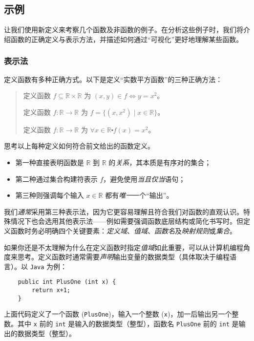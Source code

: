 
\subsection{示例}

让我们使用新定义来考察几个函数及非函数的例子。在分析这些例子时，我们将介绍函数的正确定义与表示方法，并描述如何通过``可视化''更好地理解某些函数。

\subsubsection*{表示法}

定义函数有多种正确方式。以下是定义``实数平方函数''的三种正确方法：
\begin{quotation}
    定义函数 $f \subseteq \mathbb{R} \times \mathbb{R}$ 为 $(x, y) \in f \iff y = x^2$。

    定义函数 $f : \mathbb{R} \to \mathbb{R}$ 为 $f=\big\{(x,x^2) \mid x \in \mathbb{R}\big\}$。

    定义函数 $f : \mathbb{R} \to \mathbb{R}$ 为 $\forall x \in \mathbb{R} \centerdot f(x) = x^2$。
\end{quotation}

思考以上每种定义如何符合前文给出的函数定义。
\begin{itemize}
    \item 第一种直接表明函数是 $\mathbb{R}$ 到 $\mathbb{R}$ 的\emph{关系}，其本质是有序对的集合；
    \item 第二种通过集合构建符表示 $f$，避免使用\emph{当且仅当}语句；
    \item 第三种则强调每个输入 $x \in \mathbb{R}$ 都有\emph{唯一}一个``输出''。
\end{itemize}

我们\emph{通常}采用第三种表示法，因为它更容易理解且符合我们对函数的直观认识。特殊情况下也会选用其他表示法——例如需要强调函数底层结构或简化书写时。但定义函数时务必明确四个关键要素：\emph{定义域}、\emph{值域}、\emph{函数名}及\emph{映射规则}或\emph{集合}。

如果你还是不太理解为什么在定义函数时指定\emph{值域}如此重要，可以从计算机编程角度来思考。定义函数时通常需要\emph{声明}输出变量的数据类型（具体取决于编程语言）。以 \verb|Java| 为例：
\begin{verbatim}
    public int PlusOne (int x) {
        return x+1;
    }
\end{verbatim}
上面代码定义了一个函数 (\verb|PlusOne|)，输入一个整数 (\verb|x|)，加一后输出另一个整数。其中 \verb|x| 前的 \verb|int| 是输入的数据类型（整型），函数名 \verb|PlusOne| 前的 \verb|int| 是输出的数据类型（整型）。

